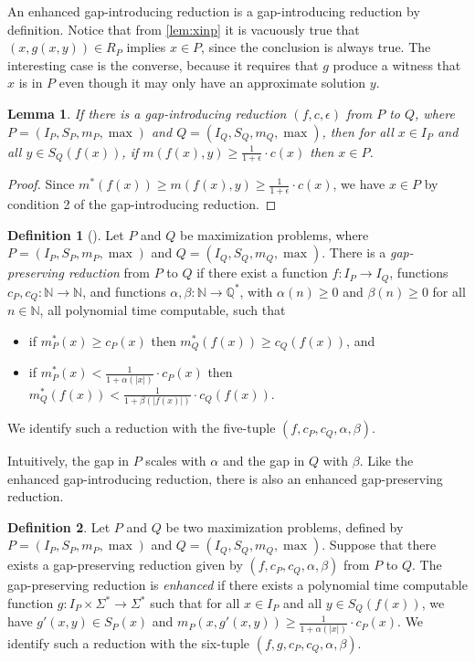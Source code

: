 \documentclass[]{article}
\theoremstyle{plain}
\newtheorem{lemma}{Lemma}
\theoremstyle{definition}
\newtheorem{definition}{Definition}
\begin{document}
An enhanced gap-introducing reduction is a gap-introducing reduction by definition.
Notice that from \autoref{lem:xinp} it is vacuously true that $\left(x, g(x, y)\right) \in R_P$ implies $x \in P$, since the conclusion is always true.
The interesting case is the converse, because it requires that $g$ produce a witness that $x$ is in $P$ even though it may only have an approximate solution $y$.

\begin{lemma}\label{lem:xinp}
  If there is a gap-introducing reduction $(f, c, \epsilon)$ from $P$ to $Q$, where $P = (I_P, S_P, m_P, \max)$ and $Q = (I_Q, S_Q, m_Q, \max)$, then for all $x \in I_P$ and all $y \in S_Q(f(x))$, if $m(f(x), y) \geq \frac{1}{1 + \epsilon} \cdot c(x)$ then $x \in P$.
\end{lemma}
\begin{proof}
  Since $m^*(f(x)) \geq m(f(x), y) \geq \frac{1}{1 + \epsilon} \cdot c(x)$, we have $x \in P$ by condition 2 of the gap-introducing reduction.
\end{proof}

\begin{definition}[{\cite[Section~29.1]{vazirani}}]
  Let $P$ and $Q$ be maximization problems, where $P = (I_P, S_P, m_P, \max)$ and $Q = (I_Q, S_Q, m_Q, \max)$.
  There is a \emph{gap-preserving reduction} from $P$ to $Q$ if there exist a function $f \colon I_P \to I_Q$, functions $c_P, c_Q \colon \mathbb{N} \to \mathbb{N}$, and functions $\alpha, \beta \colon \mathbb{N} \to \mathbb{Q}^*$, with $\alpha(n) \geq 0$ and $\beta(n) \geq 0$ for all $n \in \mathbb{N}$, all polynomial time computable, such that
  \begin{itemize}
  \item if $m^*_P(x) \geq c_P(x)$ then $m^*_Q(f(x)) \geq c_Q(f(x))$, and
  \item if $m^*_P(x) < \frac{1}{1 + \alpha(|x|)} \cdot c_P(x)$ then $m^*_Q(f(x)) < \frac{1}{1 + \beta(|f(x)|)} \cdot c_Q(f(x))$.
  \end{itemize}
  We identify such a reduction with the five-tuple $(f, c_P, c_Q, \alpha, \beta)$.
\end{definition}

Intuitively, the gap in $P$ scales with $\alpha$ and the gap in $Q$ with $\beta$.
Like the enhanced gap-introducing reduction, there is also an enhanced gap-preserving reduction.

\begin{definition}
  Let $P$ and $Q$ be two maximization problems, defined by $P = (I_P, S_P, m_P, \max)$ and $Q = (I_Q, S_Q, m_Q, \max)$.
  Suppose that there exists a gap-preserving reduction given by $(f, c_P, c_Q, \alpha, \beta)$ from $P$ to $Q$.
  The gap-preserving reduction is \emph{enhanced} if there exists a polynomial time computable function $g \colon I_P \times \Sigma^* \to \Sigma^*$ such that for all $x \in I_P$ and all $y \in S_Q(f(x))$, we have $g'(x, y) \in S_P(x)$ and $m_P(x, g'(x, y)) \geq \frac{1}{1 + \alpha(|x|)} \cdot c_P(x)$.
  We identify such a reduction with the six-tuple $(f, g, c_P, c_Q, \alpha, \beta)$.
\end{definition}
\end{document}
